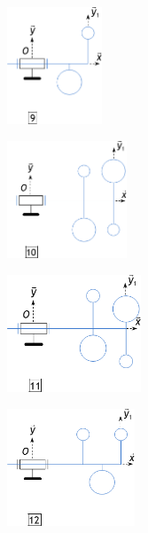 \documentclass[10pt,fleqn]{article} %
\begin{document}
\begin{multicols}{3}
\begin{center}
\includegraphics[height=3.5cm]{images/fig_09}
\end{center}


\begin{center}
\includegraphics[height=3.5cm]{images/fig_10}
\end{center}


\begin{center}
\includegraphics[height=3.5cm]{images/fig_11}
\end{center}


\begin{center}
\includegraphics[height=3.5cm]{images/fig_12}
\end{center}



\end{multicols}
\end{document}
